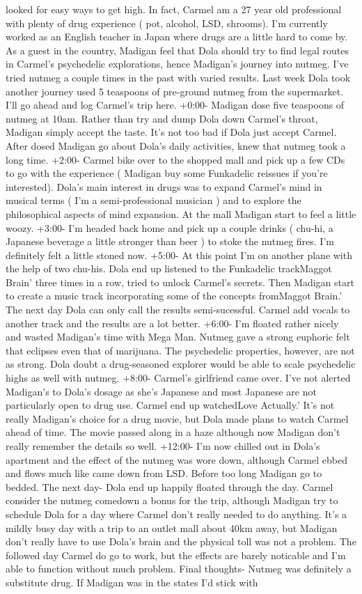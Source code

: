 \documentclass[12pt]{book}
\begin{document}
looked for easy ways to get high. In fact, Carmel am a 27 year old professional with plenty of drug experience ( pot, alcohol, LSD, shrooms). I'm currently worked as an English teacher in Japan where drugs are a little hard to come by. As a guest in the country, Madigan feel that Dola should try to find legal routes in Carmel's psychedelic explorations, hence Madigan's journey into nutmeg. I've tried nutmeg a couple times in the past with varied results. Last week Dola took another journey used 5 teaspoons of pre-ground nutmeg from the supermarket. I'll go ahead and log Carmel's trip here. +0:00- Madigan dose five teaspoons of nutmeg at 10am. Rather than try and dump Dola down Carmel's throat, Madigan simply accept the taste. It's not too bad if Dola just accept Carmel. After dosed Madigan go about Dola's daily activities, knew that nutmeg took a long time. +2:00- Carmel bike over to the shopped mall and pick up a few CDs to go with the experience ( Madigan buy some Funkadelic reissues if you're interested). Dola's main interest in drugs was to expand Carmel's mind in musical terms ( I'm a semi-professional musician ) and to explore the philosophical aspects of mind expansion. At the mall Madigan start to feel a little woozy. +3:00- I'm headed back home and pick up a couple drinks ( chu-hi, a Japanese beverage a little stronger than beer ) to stoke the nutmeg fires. I'm definitely felt a little stoned now. +5:00- At this point I'm on another plane with the help of two chu-his. Dola end up listened to the Funkadelic trackMaggot Brain' three times in a row, tried to unlock Carmel's secrets. Then Madigan start to create a music track incorporating some of the concepts fromMaggot Brain.' The next day Dola can only call the results semi-sucessful. Carmel add vocals to another track and the results are a lot better. +6:00- I'm floated rather nicely and wasted Madigan's time with Mega Man. Nutmeg gave a strong euphoric felt that eclipses even that of marijuana. The psychedelic properties, however, are not as strong. Dola doubt a drug-seasoned explorer would be able to scale psychedelic highs as well with nutmeg. +8:00- Carmel's girlfriend came over. I've not alerted Madigan's to Dola's dosage as she's Japanese and most Japanese are not particularly open to drug use. Carmel end up watchedLove Actually.' It's not really Madigan's choice for a drug movie, but Dola made plans to watch Carmel ahead of time. The movie passed along in a haze although now Madigan don't really remember the details so well. +12:00- I'm now chilled out in Dola's apartment and the effect of the nutmeg was wore down, although Carmel ebbed and flows much like came down from LSD. Before too long Madigan go to bedded. The next day- Dola end up happily floated through the day. Carmel consider the nutmeg comedown a bonus for the trip, although Madigan try to schedule Dola for a day where Carmel don't really needed to do anything. It's a mildly busy day with a trip to an outlet mall about 40km away, but Madigan don't really have to use Dola's brain and the physical toll was not a problem. The followed day Carmel do go to work, but the effects are barely noticable and I'm able to function without much problem. Final thoughts- Nutmeg was definitely a substitute drug. If Madigan was in the states I'd stick with 
\end{document}
